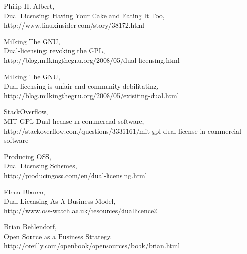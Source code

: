 \documentclass[11pt]{scrartcl}
\begin{document}
\begin{thebibliography}{9}

    Philip H. Albert,\\
    Dual Licensing: Having Your Cake and Eating It Too,\\
    http://www.linuxinsider.com/story/38172.html

    Milking The GNU,\\
    Dual-licensing: revoking the GPL,\\
    http://blog.milkingthegnu.org/2008/05/dual-licensing.html

    Milking The GNU,\\
    Dual-licensing is unfair and community debilitating,\\
    http://blog.milkingthegnu.org/2008/05/exisiting-dual.html

    StackOverflow,\\
    MIT GPL Dual-license in commercial software,\\
    http://stackoverflow.com/questions/3336161/mit-gpl-dual-license-in-commercial-software

    Producing OSS,\\
    Dual Licensing Schemes,\\
    http://producingoss.com/en/dual-licensing.html

    Elena Blanco,\\
    Dual-Licensing As A Business Model,\\
    http://www.oss-watch.ac.uk/resources/duallicence2

    Brian Behlendorf,\\
    Open Source as a Business Strategy,\\
    http://oreilly.com/openbook/opensources/book/brian.html
\end{thebibliography}
\end{document}

